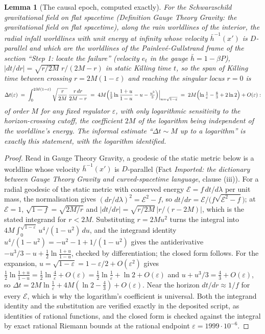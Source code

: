 \documentclass[11pt]{article}
\newtheorem{lemma}[theorem]{Lemma}
\theoremstyle{definition}
\theoremstyle{plain}
\newcommand{\changedmark}[2]{\marginpar{\raggedright\scriptsize\color{#1}#2}}
\providecommand{\hb}{}\renewcommand{\hb}{\bar{h}}
\begin{document}
\begin{lemma}[The causal epoch, computed exactly]\label{c:singularity.causal-epoch-computed-exactly}
\changedmark{gray}{reworded}
For the Schwarzschild gravitational field on flat spacetime (Definition \emph{Gauge Theory Gravity: the gravitational field on flat spacetime}), along the rain worldlines of the interior, the radial infall worldlines with unit energy at infinity whose velocity $\hb^{-1}(x')$ is $D$-parallel and which are the worldlines of the Painlev\'e-Gullstrand frame of the section ``Step 1: locate the failure'' (velocity $e_t$ in the gauge $\hb = 1 - \beta P$), $|dt/dr| = \sqrt{r/2M}\;r/(2M - r)$ in static Killing time $t$, so the span of Killing time between crossing $r = 2M(1 - \varepsilon)$ and reaching the singular locus $r = 0$ is
\[
\Delta t(\varepsilon) \;=\; \int_0^{2M(1-\varepsilon)} \sqrt{\frac{r}{2M}}\,\frac{r\,dr}{2M - r}
\;=\; 4M\Bigl(\tfrac12\ln\frac{1+u}{1-u} - u - \tfrac{u^{3}}{3}\Bigr)\Big|_{u = \sqrt{1-\varepsilon}}
\;=\; 2M\Bigl(\ln\tfrac{1}{\varepsilon} - \tfrac83 + 2\ln 2\Bigr) + O(\varepsilon) :
\]
of order $M$ for any fixed regulator $\varepsilon$, with only logarithmic sensitivity to the horizon-crossing cutoff, the coefficient $2M$ of the logarithm being independent of the worldline's energy. The informal estimate ``$\Delta t \sim M$ up to a logarithm'' is exactly this statement, with the logarithm identified.
\end{lemma}
\begin{proof}
Read in Gauge Theory Gravity, a geodesic of the static metric below is a worldline whose velocity $\hb^{-1}(x')$ is $D$-parallel (Fact \emph{Imported: the dictionary between Gauge Theory Gravity and curved-spacetime language}, clause (iii)). For a radial geodesic of the static metric with conserved energy $\mathcal{E} = f\,dt/d\lambda$ per unit mass, the normalisation gives $(dr/d\lambda)^{2} = \mathcal{E}^{2} - f$, so $dt/dr = \mathcal{E}/\bigl(f\sqrt{\mathcal{E}^{2} - f}\bigr)$; at $\mathcal{E} = 1$, $\sqrt{1 - f} = \sqrt{2M/r}$ and $|dt/dr| = \sqrt{r/2M}\,\bigl|r/(r - 2M)\bigr|$, which is the stated integrand for $r < 2M$. Substituting $r = 2Mu^{2}$ turns the integral into $4M\int_0^{\sqrt{1-\varepsilon}} u^{4}/(1 - u^{2})\,du$, and the integrand identity $u^{4}/(1 - u^{2}) = -u^{2} - 1 + 1/(1 - u^{2})$ gives the antiderivative $-u^{3}/3 - u + \tfrac12\ln\frac{1+u}{1-u}$, checked by differentiation; the closed form follows. For the expansion, $u = \sqrt{1 - \varepsilon} = 1 - \varepsilon/2 + O(\varepsilon^{2})$ gives $\tfrac12\ln\frac{1+u}{1-u} = \tfrac12\ln\frac{4}{\varepsilon} + O(\varepsilon) = \tfrac12\ln\tfrac1\varepsilon + \ln 2 + O(\varepsilon)$ and $u + u^{3}/3 = \tfrac43 + O(\varepsilon)$, so $\Delta t = 2M\ln\tfrac1\varepsilon + 4M(\ln 2 - \tfrac43) + O(\varepsilon)$. Near the horizon $dt/dr \approx 1/f$ for every $\mathcal{E}$, which is why the logarithm's coefficient is universal. Both the integrand identity and the substitution are verified exactly in the deposited script, as identities of rational functions, and the closed form is checked against the integral by exact rational Riemann bounds at the rational endpoint $\varepsilon = 1999 \cdot 10^{-6}$.

\end{proof}
\end{document}
